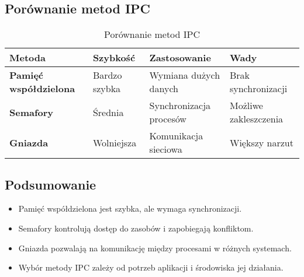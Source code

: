 \subsection{Porównanie metod IPC}

\begin{table}[h]
    \centering
    \renewcommand{\arraystretch}{1.3} %
    \begin{tabularx}{\textwidth}{|l|X|X|X|}
        \hline
        \textbf{Metoda} & \textbf{Szybkość} & \textbf{Zastosowanie} & \textbf{Wady} \\
        \hline
        \textbf{Pamięć współdzielona} & Bardzo szybka & Wymiana dużych danych & Brak synchronizacji \\
        \hline
        \textbf{Semafory} & Średnia & Synchronizacja procesów & Możliwe zakleszczenia \\
        \hline
        \textbf{Gniazda} & Wolniejsza & Komunikacja sieciowa & Większy narzut \\
        \hline
    \end{tabularx}
    \caption{Porównanie metod IPC}
\end{table}


\subsection{Podsumowanie}
\begin{itemize}
    \item Pamięć współdzielona jest szybka, ale wymaga synchronizacji.
    \item Semafory kontrolują dostęp do zasobów i zapobiegają konfliktom.
    \item Gniazda pozwalają na komunikację między procesami w różnych systemach.
    \item Wybór metody IPC zależy od potrzeb aplikacji i środowiska jej działania.
\end{itemize}
